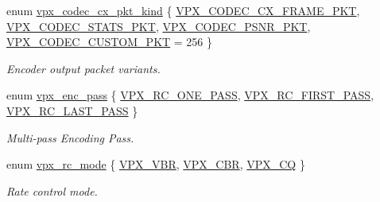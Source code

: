 \begin{DoxyCompactItemize}
\item 
enum \hyperlink{group__encoder_ga28a79375279536526552af3a83d2ed72}{vpx\-\_\-codec\-\_\-cx\-\_\-pkt\-\_\-kind} \{ \hyperlink{group__encoder_gga28a79375279536526552af3a83d2ed72a2261aae5594289400e812fb1e6b6b0cc}{V\-P\-X\-\_\-\-C\-O\-D\-E\-C\-\_\-\-C\-X\-\_\-\-F\-R\-A\-M\-E\-\_\-\-P\-K\-T}, 
\hyperlink{group__encoder_gga28a79375279536526552af3a83d2ed72a77cd8b95d9891bcce36117f5f31994fd}{V\-P\-X\-\_\-\-C\-O\-D\-E\-C\-\_\-\-S\-T\-A\-T\-S\-\_\-\-P\-K\-T}, 
\hyperlink{group__encoder_gga28a79375279536526552af3a83d2ed72a11eefa1328e6d22eb7c844645a260628}{V\-P\-X\-\_\-\-C\-O\-D\-E\-C\-\_\-\-P\-S\-N\-R\-\_\-\-P\-K\-T}, 
\hyperlink{group__encoder_gga28a79375279536526552af3a83d2ed72a7b54c122969397b1926de853d28b3c80}{V\-P\-X\-\_\-\-C\-O\-D\-E\-C\-\_\-\-C\-U\-S\-T\-O\-M\-\_\-\-P\-K\-T} = 256
 \}
\begin{DoxyCompactList}\small\item\em Encoder output packet variants. \end{DoxyCompactList}\item 
enum \hyperlink{group__encoder_ga476c5417f9c15a1dc5d3f68fa44c493f}{vpx\-\_\-enc\-\_\-pass} \{ \hyperlink{group__encoder_gga476c5417f9c15a1dc5d3f68fa44c493fa7b6943a41868e8e26a77e9500f139ca1}{V\-P\-X\-\_\-\-R\-C\-\_\-\-O\-N\-E\-\_\-\-P\-A\-S\-S}, 
\hyperlink{group__encoder_gga476c5417f9c15a1dc5d3f68fa44c493faa0765945345b160905f3b762986dae3b}{V\-P\-X\-\_\-\-R\-C\-\_\-\-F\-I\-R\-S\-T\-\_\-\-P\-A\-S\-S}, 
\hyperlink{group__encoder_gga476c5417f9c15a1dc5d3f68fa44c493fa65da543b956d6a9b1f301ab8cc90d3a7}{V\-P\-X\-\_\-\-R\-C\-\_\-\-L\-A\-S\-T\-\_\-\-P\-A\-S\-S}
 \}
\begin{DoxyCompactList}\small\item\em Multi-\/pass Encoding Pass. \end{DoxyCompactList}\item 
enum \hyperlink{group__encoder_gaf50e74d91be4cae6f70dfeba5b7410d2}{vpx\-\_\-rc\-\_\-mode} \{ \hyperlink{group__encoder_ggaf50e74d91be4cae6f70dfeba5b7410d2ab8fbe4441ed3f31a167c8194e8a64f87}{V\-P\-X\-\_\-\-V\-B\-R}, 
\hyperlink{group__encoder_ggaf50e74d91be4cae6f70dfeba5b7410d2a8b02853cb35790d60cc171a11f6c268a}{V\-P\-X\-\_\-\-C\-B\-R}, 
\hyperlink{group__encoder_ggaf50e74d91be4cae6f70dfeba5b7410d2a5f2fd02b55c67d62bfd79380bcb03f63}{V\-P\-X\-\_\-\-C\-Q}
 \}
\begin{DoxyCompactList}\small\item\em Rate control mode. \end{DoxyCompactList}\item 

\end{DoxyCompactItemize}
